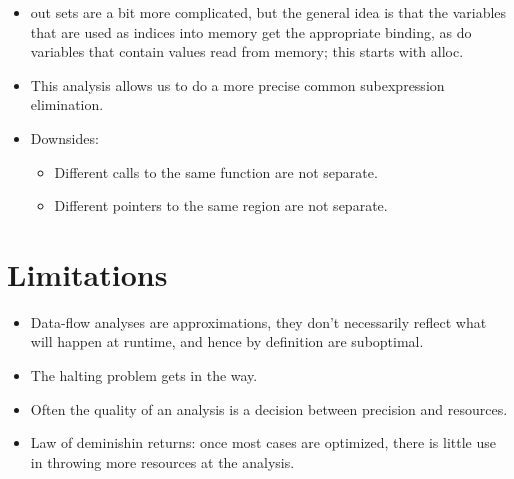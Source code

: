 \begin{itemize}
\item out sets are a bit more complicated, but the general idea is that the
variables that are used as indices into memory get the appropriate binding, as
do variables that contain values read from memory; this starts with alloc.

\item This analysis allows us to do a more precise common subexpression
elimination.

\item Downsides:

\begin{itemize}

\item Different calls to the same function are not separate.

\item Different pointers to the same region are not separate.

\end{itemize}

\end{itemize}

\section{Limitations}

\begin{itemize}

\item Data-flow analyses are approximations, they don't necessarily reflect
what will happen at runtime, and hence by definition are suboptimal.

\item The halting problem gets in the way.

\item Often the quality of an analysis is a decision between precision and
resources.

\item Law of deminishin returns: once most cases are optimized, there is little
use in throwing more resources at the analysis.

\end{itemize}
